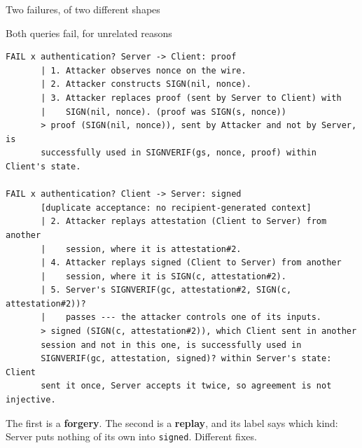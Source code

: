 \ifdefined\PRESENTATION\else\PassOptionsToClass{handout}{beamer}\fi\documentclass[aspectratio=169, lualatex]{beamer}
\newcommand{\vpcode}{\fontsize{6}{6.4}\selectfont\ttfamily\color{vpink}}
\begin{document}
\begin{frame}[fragile]{Two failures, of two different shapes}
	\begin{vpresult}[top=0.5mm, bottom=0.5mm]{Both queries fail, for unrelated reasons}
		\begin{lstlisting}[basicstyle=\vpcode]
FAIL x authentication? Server -> Client: proof
       | 1. Attacker observes nonce on the wire.
       | 2. Attacker constructs SIGN(nil, nonce).
       | 3. Attacker replaces proof (sent by Server to Client) with
       |    SIGN(nil, nonce). (proof was SIGN(s, nonce))
       > proof (SIGN(nil, nonce)), sent by Attacker and not by Server, is
       successfully used in SIGNVERIF(gs, nonce, proof) within Client's state.

FAIL x authentication? Client -> Server: signed
       [duplicate acceptance: no recipient-generated context]
       | 2. Attacker replays attestation (Client to Server) from another
       |    session, where it is attestation#2.
       | 4. Attacker replays signed (Client to Server) from another
       |    session, where it is SIGN(c, attestation#2).
       | 5. Server's SIGNVERIF(gc, attestation#2, SIGN(c, attestation#2))?
       |    passes --- the attacker controls one of its inputs.
       > signed (SIGN(c, attestation#2)), which Client sent in another
       session and not in this one, is successfully used in
       SIGNVERIF(gc, attestation, signed)? within Server's state: Client
       sent it once, Server accepts it twice, so agreement is not injective.
\end{lstlisting}
	\end{vpresult}
	\begin{center}
		\small The first is a \textbf{forgery}. The second is a \textbf{replay}, and its label says which kind: Server puts nothing of its own into \texttt{signed}. Different fixes.
	\end{center}
\end{frame}
\end{document}
